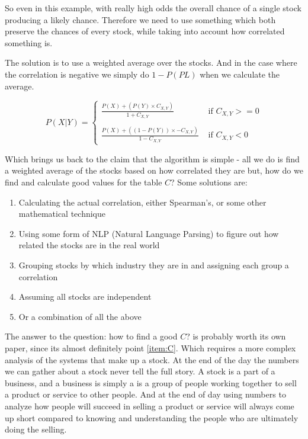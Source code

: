 \documentclass[12pt]{article}
\begin{document}
    So even in this example, with really high odds the overall chance of a single stock
    producing a likely chance. Therefore we need to use something which both preserve
    the chances of every stock, while taking into account how correlated something is.

    The solution is to use a weighted average over the stocks.
    And in the case where the correlation is negative we simply do \(1 - P(PL)\)
    when we calculate the average.

    \begin{equation} \label{eq:StockWeight}
        P ( X | Y ) = 
        \begin{cases}
            \displaystyle\frac 
                {P( X ) + (P ( Y ) \times C_{X, Y})}
                {1 + C_{X, Y}} 
                & \text{ if } C_{X, Y} >= 0\\
            \\
            \displaystyle\frac
                {P( X ) + ((1 - P ( Y )) \times - C_{X, Y})}
                {1 - C_{X, Y}} 
                & \text{ if } C_{X, Y} < 0
        \end{cases}
    \end{equation}

    Which brings us back to the claim that the algorithm is simple - all we do is find a
    weighted average of the stocks based on how correlated they are but, how do we find 
    and calculate good values for the table \(C\)? Some solutions are:

    \begin{enumerate}
        \item{Calculating the actual correlation, either Spearman's, or some other mathematical technique}
        \item{Using some form of NLP (Natural Language Parsing) to figure out how related the stocks are in the real world}
        \item{Grouping stocks by which industry they are in and assigning each group a correlation}
        \item{Assuming all stocks are independent}
        \item{Or a combination of all the above}\label{item:C}
    \end{enumerate}

    The answer to the question: how to find a good \(C\)? is probably worth its own paper, since
    its almost definitely point \ref{item:C}. Which requires a more complex analysis of the systems
    that make up a stock. At the end of the day the numbers we can gather about a stock never
    tell the full story. A stock is a part of a business, and a business is simply a is a
    group of people working together to sell a product or service to other people.
    And at the end of day using numbers to analyze how people will succeed in selling
    a product or service will always come up short compared to knowing and understanding
    the people who are ultimately doing the selling.
\end{document}
